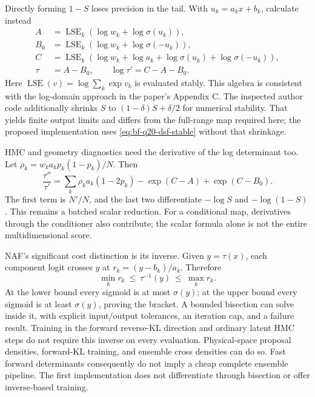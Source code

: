 Directly forming $1-S$ loses precision in the tail. With
$u_k=a_kx+b_k$, calculate instead
\begin{align}
 A&=\operatorname{LSE}_k(\log w_k+\log\sigma(u_k)),\\
 B_0&=\operatorname{LSE}_k(\log w_k+\log\sigma(-u_k)),\\
 C&=\operatorname{LSE}_k(\log w_k+\log a_k+
                         \log\sigma(u_k)+\log\sigma(-u_k)),\\
 \tau&=A-B_0,\qquad \log\tau'=C-A-B_0.
 \label{eq:bf-q20-dsf-stable}
\end{align}
Here $\operatorname{LSE}(v)=\log\sum_k\exp v_k$ is evaluated stably.
This algebra is consistent with the log-domain approach in the paper's
Appendix C. The inspected author code additionally shrinks $S$ to
$(1-\delta)S+\delta/2$ for numerical stability. That yields finite output
limits and differs from the full-range map required here; the proposed
implementation uses \eqref{eq:bf-q20-dsf-stable} without that shrinkage.

HMC and geometry diagnostics need the derivative of the log determinant too.
Let $\rho_k=w_ka_kp_k(1-p_k)/N$. Then
\begin{equation}
 \frac{\tau''}{\tau'}
 =\sum_k\rho_ka_k(1-2p_k)-\exp(C-A)+\exp(C-B_0).
 \label{eq:bf-q20-dsf-force}
\end{equation}
The first term is $N'/N$, and the last two differentiate $-\log S$ and
$-\log(1-S)$. This remains a batched scalar reduction. For a conditional
map, derivatives through the conditioner also contribute; the scalar formula
alone is not the entire multidimensional score.

NAF's significant cost distinction is its inverse. Given $y=\tau(x)$, each
component logit crosses $y$ at $r_k=(y-b_k)/a_k$. Therefore
\begin{equation}
 \min_k r_k\ \leq\ \tau^{-1}(y)\ \leq\ \max_k r_k.
 \label{eq:bf-q20-dsf-bracket}
\end{equation}
At the lower bound every sigmoid is at most $\sigma(y)$; at the upper bound
every sigmoid is at least $\sigma(y)$, proving the bracket. A bounded bisection
can solve inside it, with explicit input/output tolerances, an iteration cap,
and a failure result. Training in the forward reverse-KL direction and ordinary
latent HMC steps do not require this inverse on every evaluation. Physical-space
proposal densities, forward-KL training, and ensemble cross densities can do so.
Fast forward determinants consequently do not imply a cheap complete ensemble
pipeline. The first implementation does not differentiate through bisection or
offer inverse-based training.

